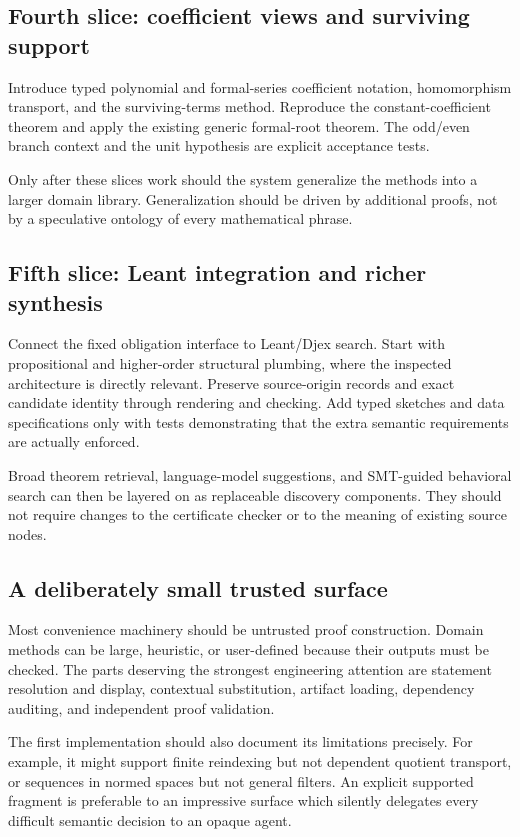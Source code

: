 \documentclass[11pt,letterpaper]{article}
\theoremstyle{definition}
\theoremstyle{remark}
\begin{document}
\subsection{Fourth slice: coefficient views and surviving support}
Introduce typed polynomial and formal-series coefficient notation, homomorphism transport, and the surviving-terms method. Reproduce the constant-coefficient theorem and apply the existing generic formal-root theorem. The odd/even branch context and the unit hypothesis are explicit acceptance tests.

Only after these slices work should the system generalize the methods into a larger domain library. Generalization should be driven by additional proofs, not by a speculative ontology of every mathematical phrase.

\subsection{Fifth slice: Leant integration and richer synthesis}
Connect the fixed obligation interface to Leant/Djex search. Start with propositional and higher-order structural plumbing, where the inspected architecture is directly relevant. Preserve source-origin records and exact candidate identity through rendering and checking. Add typed sketches and data specifications only with tests demonstrating that the extra semantic requirements are actually enforced.

Broad theorem retrieval, language-model suggestions, and SMT-guided behavioral search can then be layered on as replaceable discovery components. They should not require changes to the certificate checker or to the meaning of existing source nodes.

\subsection{A deliberately small trusted surface}
Most convenience machinery should be untrusted proof construction. Domain methods can be large, heuristic, or user-defined because their outputs must be checked. The parts deserving the strongest engineering attention are statement resolution and display, contextual substitution, artifact loading, dependency auditing, and independent proof validation.

The first implementation should also document its limitations precisely. For example, it might support finite reindexing but not dependent quotient transport, or sequences in normed spaces but not general filters. An explicit supported fragment is preferable to an impressive surface which silently delegates every difficult semantic decision to an opaque agent.
\end{document}
